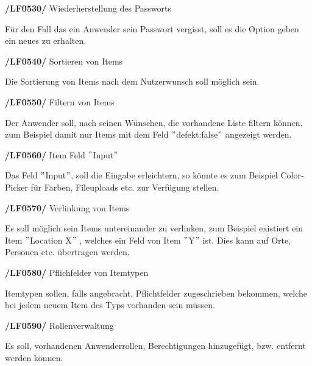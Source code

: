\documentclass[11pt,a4paper]{report}
\begin{document}
\textbf{/LF0530/} Wiederherstellung des Passworts
\par
\begingroup
\leftskip=1cm
\noindent Für den Fall das ein Anwender sein Passwort vergisst, soll es die Option geben ein neues zu erhalten.\\
\par
\endgroup

\textbf{/LF0540/} Sortieren von Items
\par
\begingroup
\leftskip=1cm
\noindent Die Sortierung von Items nach dem Nutzerwunsch soll möglich sein.\\
\par
\endgroup

\textbf{/LF0550/} Filtern von Items
\par
\begingroup
\leftskip=1cm
\noindent Der Anwender soll, nach seinen Wünschen, die vorhandene Liste filtern können, zum Beispiel damit nur Items mit dem Feld $"$defekt:false$"$ angezeigt werden.\\
\par
\endgroup

\textbf{/LF0560/} Item Feld $"$Input$"$
\par
\begingroup
\leftskip=1cm
\noindent Das Feld $"$Input$"$, soll die Eingabe erleichtern, so könnte es zum Beispiel Color-Picker für Farben, Fileuploads etc. zur Verfügung stellen.\\
\par
\endgroup

\newpage
\textbf{/LF0570/} Verlinkung von Items
\par
\begingroup
\leftskip=1cm
\noindent Es soll möglich sein Items untereinander zu verlinken, zum Beispiel existiert ein Item $"$Location X$"$ , welches ein Feld von Item $"$Y$"$ ist.
Dies kann auf Orte, Personen etc. übertragen werden.\\
\par
\endgroup

\textbf{/LF0580/} Pflichfelder von Itemtypen
\par
\begingroup
\leftskip=1cm
\noindent Itemtypen sollen, falls angebracht, Pflichtfelder zugeschrieben bekommen, welche bei jedem neuem Item des Typs vorhanden sein müssen.\\
\par
\endgroup

\textbf{/LF0590/} Rollenverwaltung
\par
\begingroup
\leftskip=1cm
\noindent Es soll, vorhandenen Anwenderrollen, Berechtigungen hinzugefügt, bzw. entfernt werden können.\\
\par
\endgroup
\end{document}
